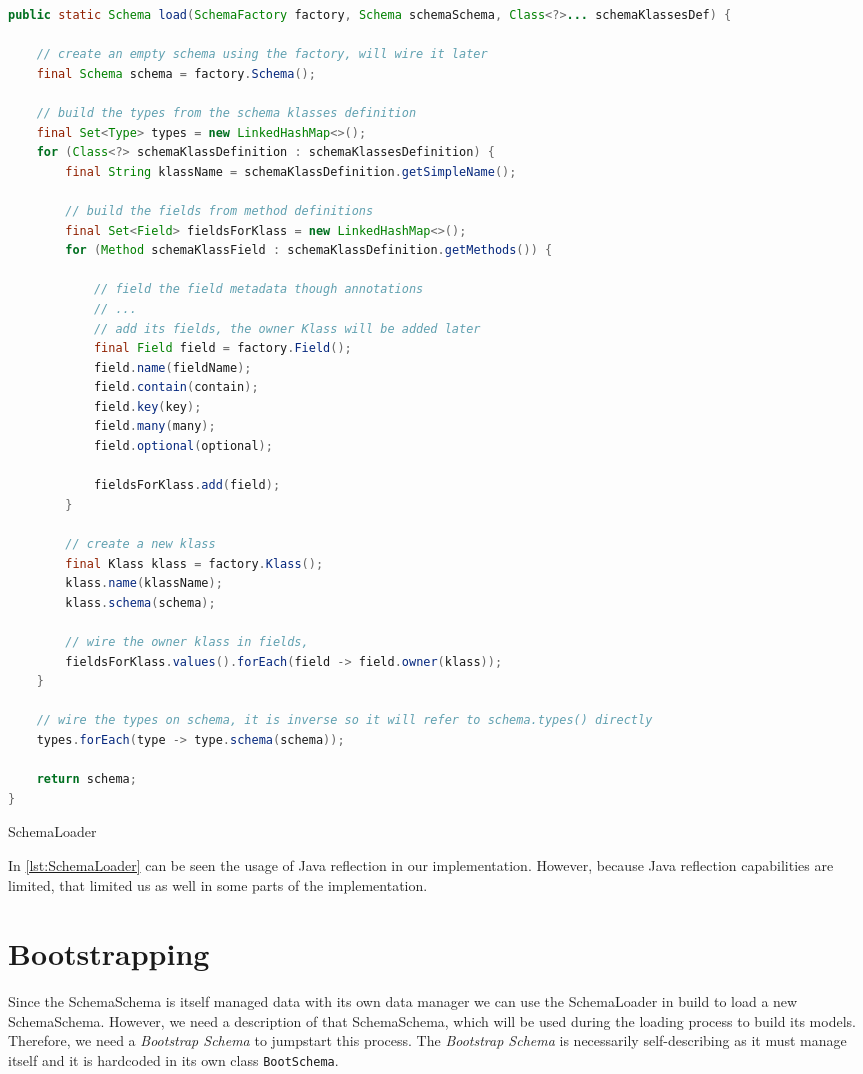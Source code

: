 \begin{sourcecode} [H]
	\begin{lstlisting}[language=Java, escapechar=|]
public static Schema load(SchemaFactory factory, Schema schemaSchema, Class<?>... schemaKlassesDef) {

	// create an empty schema using the factory, will wire it later
	final Schema schema = factory.Schema();

	// build the types from the schema klasses definition
	final Set<Type> types = new LinkedHashMap<>();
	for (Class<?> schemaKlassDefinition : schemaKlassesDefinition) {
		final String klassName = schemaKlassDefinition.getSimpleName();

		// build the fields from method definitions
		final Set<Field> fieldsForKlass = new LinkedHashMap<>();
		for (Method schemaKlassField : schemaKlassDefinition.getMethods()) {

			// field the field metadata though annotations
			// ...
			// add its fields, the owner Klass will be added later
            final Field field = factory.Field();
            field.name(fieldName);
            field.contain(contain);
            field.key(key);
            field.many(many);
            field.optional(optional);

            fieldsForKlass.add(field);
		}
    
		// create a new klass
		final Klass klass = factory.Klass();
		klass.name(klassName);
		klass.schema(schema);

		// wire the owner klass in fields,
		fieldsForKlass.values().forEach(field -> field.owner(klass));
	}

	// wire the types on schema, it is inverse so it will refer to schema.types() directly
	types.forEach(type -> type.schema(schema));

	return schema;
}
	\end{lstlisting}
	\caption{SchemaLoader}
	\label{lst:SchemaLoader}
\end{sourcecode}

In \ref{lst:SchemaLoader} can be seen the usage of Java reflection in our implementation.
However, because Java reflection capabilities are limited, that limited us as well in some parts of the implementation.

\section{Bootstrapping}\label{sec:Bootstrapping}
Since the SchemaSchema is itself managed data with its own data manager we can use the SchemaLoader in build to load a new SchemaSchema.
However, we need a description of that SchemaSchema, which will be used during the loading process to build its models.
Therefore, we need a \textit{Bootstrap Schema} to jumpstart this process.
The \textit{Bootstrap Schema} is necessarily self-describing as it must manage itself \cite{loh2012managed} and it is hardcoded in its own class \texttt{BootSchema}.

